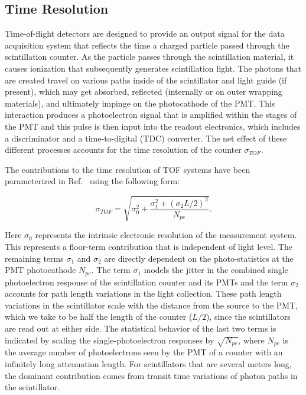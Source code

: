 \documentclass{elsart}
\begin{document}
\subsection{Time Resolution}
\label{res-sec}

Time-of-flight detectors are designed to provide an output signal for the data acquisition system that
reflects the time a charged particle passed through the scintillation counter. As the particle passes
through the scintillation material, it causes ionization that subsequently generates scintillation light. The
photons that are created travel on various paths inside of the scintillator and light guide (if present), which
may get absorbed, reflected (internally or on outer wrapping materials), and ultimately impinge on the
photocathode of the PMT. This interaction produces a photoelectron signal that is amplified within the stages
of the PMT and this pulse is then input into the readout electronics, which includes a discriminator and a
time-to-digital (TDC) converter. The net effect of these different processes accounts for the time resolution
of the counter $\sigma_{TOF}$.

The contributions to the time resolution of TOF systems have been parameterized in Ref.~\cite{kuhlen}
using the following form:

\begin{equation}
\label{timing-func}
\sigma_{TOF} = \sqrt{\sigma_0^2 + \frac{\sigma_1^2 + (\sigma_2 L/2)^2} {N_{pe}}}.
\end{equation}

Here $\sigma_0$ represents the intrinsic electronic resolution of the measurement system. This represents
a floor-term contribution that is independent of light level. The remaining terms $\sigma_1$ and $\sigma_2$
are directly dependent on the photo-statistics at the PMT photocathode $N_{pe}$. The term $\sigma_1$
models the jitter in the combined single photoelectron response of the scintillation counter and its PMTs and
the term $\sigma_2$ accounts for path length variations in the light collection.  These path length variations
in the scintillator scale with the distance from the source to the PMT, which we take to be half the length of
the counter ($L/2$), since the scintillators are read out at either side.  The statistical behavior of the last
two terms is indicated by scaling the single-photoelectron responses by $\sqrt{N_{pe}}$, where $N_{pe}$ is
the average number of photoelectrons seen by the PMT of a counter with an infinitely long attenuation length.
For scintillators that are several meters long, the dominant contribution comes from transit time variations of
photon paths in the scintillator.
\end{document}
